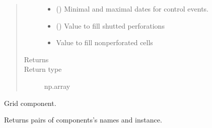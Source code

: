 \documentclass[letterpaper,10pt,english]{sphinxmanual}
\begin{document}
\begin{fulllineitems}
\begin{fulllineitems}
\begin{quote}
\begin{description}
\begin{itemize}
\item {} 
 () \textendash{} Minimal and maximal dates for control events.

\item {} 
 () \textendash{} Value to fill shutted perforations

\item {} 
 \textendash{} Value to fill non\sphinxhyphen{}perforated cells

\end{itemize}

\item[{Returns}] \leavevmode
{}

\item[{Return type}] \leavevmode
np.array

\end{description}\end{quote}

\end{fulllineitems}


\begin{fulllineitems}
\label{\detokenize{api/field:geology.src.Field.grid}}
Grid component.

\end{fulllineitems}


\begin{fulllineitems}
\label{\detokenize{api/field:geology.src.Field.items}}
Returns pairs of components’s names and instance.

\end{fulllineitems}



\end{fulllineitems}
\end{document}
